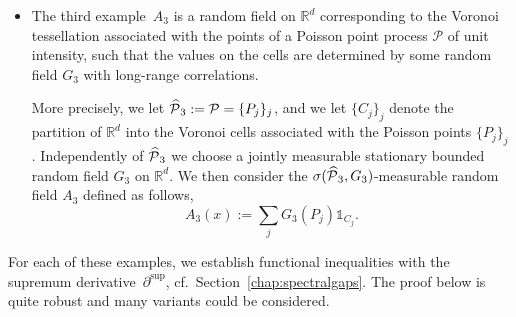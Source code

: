 \documentclass[AHL,Unicode,longabstracts]{cedram}
\newcommand{\R}{\mathbb R}
\newcommand{\Pc}{\mathcal P}
\newcommand{\parsup}[1]{\partial_{#1}^{\operatorname{\sup}}}
\renewcommand*{\hat}[1]{\mathchoice{\widehat{#1}}{\widehat{#1}}{\oldhat{#1}}{\oldhat{#1}}}\let\oldexists\exists
\renewcommand*{\exists}{\mathrel{\oldexists}}
\begin{document}
\begin{itemize}
\item The third example~$A_3$ is a random field on $\R^d$ corresponding to the Voronoi tessellation associated with the points of a Poisson point process $\Pc$ of unit intensity, such that the values on the cells are determined by some random field $G_3$ with long-range correlations.


More precisely, we let $\hat\Pc_3:=\Pc=\{P_j\}_j$, and we let $\{C_j\}_j$ denote the partition of $\R^d$ into the Voronoi cells associated with the Poisson points $\{P_j\}_j$. Independently of $\hat\Pc_3$ we choose a jointly measurable stationary bounded random field $G_3$ on $\R^d$. We then consider the $\sigma(\hat\Pc_3,G_3)$-measurable random field $A_3$ defined as follows,
\[
A_3(x):=\sum_jG_3(P_j)\mathds1_{C_j}.
\]
\end{itemize}

For each of these examples, we establish functional inequalities with the supremum derivative~$\parsup{}$, cf.~Section~\ref{chap:spectralgaps}. The proof below is quite robust and many variants could be considered.
\end{document}

